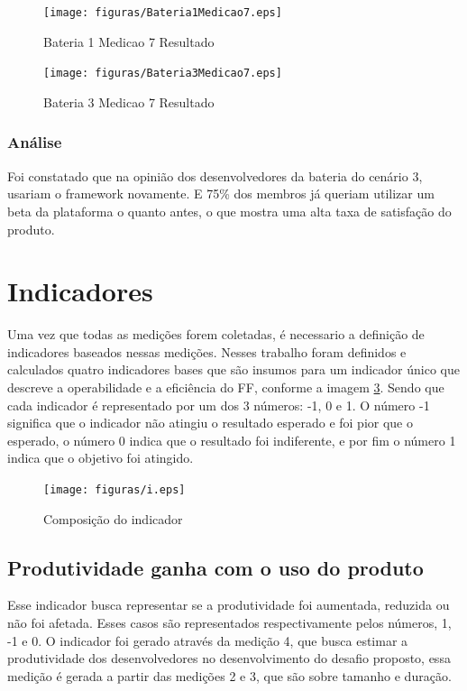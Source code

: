 \begin{figure}[H]
  \centering
  \label{fig:indicadores}
  \texttt{[image: figuras/Bateria1Medicao7.eps]}
  \caption{Bateria 1 Medicao 7 Resultado}
\end{figure}


\begin{figure}[H]
  \centering
  \label{fig:indicadores}
  \texttt{[image: figuras/Bateria3Medicao7.eps]}
  \caption{Bateria 3 Medicao 7 Resultado}
\end{figure}



\subsubsection{Análise}

Foi constatado que na opinião dos desenvolvedores da bateria do cenário 3, usariam o framework novamente. E
75\% dos membros já queriam utilizar um beta da plataforma o quanto antes, o que mostra uma alta taxa de satisfação
do produto.

\section{Indicadores}\label{ss:indicadores}

Uma vez que todas as medições forem coletadas, é necessario a definição de indicadores baseados nessas medições.
Nesses trabalho foram definidos e calculados quatro indicadores bases que são insumos para um indicador único que descreve
a operabilidade e a eficiência do FF, conforme a imagem \ref{fig:indicadores}. Sendo que cada indicador é representado por
um dos 3 números: -1, 0 e 1. O número -1 significa que o indicador não atingiu o resultado esperado e foi pior que o esperado,
o número 0 indica que o resultado foi indiferente, e por fim o número 1 indica que o objetivo foi atingido.

\begin{figure}[H]
  \centering
  \label{fig:indicadores}
  \texttt{[image: figuras/i.eps]}
  \caption{Composição do indicador}
\end{figure}

\subsection{Produtividade ganha com o uso do produto}

Esse indicador busca representar se a produtividade foi aumentada, reduzida ou não foi afetada. Esses casos são representados
respectivamente pelos números, 1, -1 e 0. O indicador foi gerado através da medição 4, que busca estimar a produtividade
dos desenvolvedores no desenvolvimento do desafio proposto, essa medição é gerada a partir das medições 2 e 3, que
são sobre tamanho e duração.

